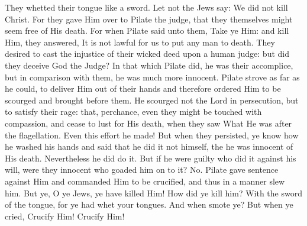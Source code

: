 {{They whetted their tongue like a sword. Let not the Jews say: We did not kill Christ. For they gave Him over to Pilate the judge, that they themselves might seem free of His death. For when Pilate said unto them, Take ye Him: and kill Him, they answered, It is not lawful for us to put any man to death. They desired to cast the injustice of their wicked deed upon a human judge: but did they deceive God the Judge? In that which Pilate did, he was their accomplice, but in comparison with them, he was much more innocent. Pilate strove as far as he could, to deliver Him out of their hands and therefore ordered Him to be scourged and brought before them. He scourged not the Lord in persecution, but to satisfy their rage: that, perchance, even they might be touched with compassion, and cease to lust for His death, when they saw What He was after the flagellation. Even this effort he made! But when they persisted, ye know how he washed his hands and said that he did it not himself, the he was innocent of His death. Nevertheless he did do it. But if he were guilty who did it against his will, were they innocent who goaded him on to it? No. Pilate gave sentence against Him and commanded Him to be crucified, and thus in a manner slew him. But ye, O ye Jews, ye have killed Him! How did ye kill him? With the sword of the tongue, for ye had whet your tongues. And when smote ye? But when ye cried, Crucify Him! Crucify Him!}
}%

\bigskip\bigskip
\pagebreak
\myrespsize
{\label{resp6_animam_meam}
}

\vspace{-0.5\baselineskip}
{}
\myantsize
